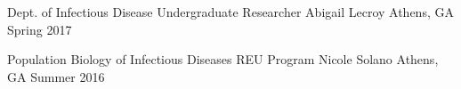\begin{cventries}

    \cventry
    {Dept. of Infectious Disease Undergraduate Researcher} %
    {Abigail Lecroy} %
    {Athens, GA} %
    {Spring 2017} %
    {
      \begin{cvitems}
      \end{cvitems}
    }

    \cventry
    {Population Biology of Infectious Diseases REU Program} %
    {Nicole Solano} %
    {Athens, GA} %
    {Summer 2016} %
    {
      \begin{cvitems}
      \end{cvitems}
    }

\end{cventries}
